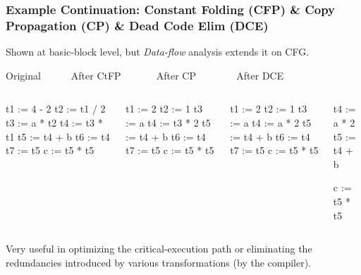 \documentclass{beamer}
\newcommand{\emp}[1]{\textcolor{DikuRed}{ #1}}
\begin{document}
\begin{frame}[fragile,t]
    \frametitle{Example Continuation: Constant Folding (CFP) \&
                    Copy Propagation (CP) \& Dead Code Elim (DCE)}

Shown at basic-block level, but {\em Data-flow} analysis extends it on CFG.

\begin{block}{Original{\tt~~~~~~}After CtFP{\tt~~~~~~~}After CP{\tt~~~~~~~~}After DCE}
\begin{columns}
\begin{colorcode}[fontsize=\scriptsize]
\emp{t1 := 4  - 2}
\emp{t2 := t1 / 2}
t3 := a  * \emp{t2}
t4 := t3 * \emp{t1}
t5 := t4 + b
t6 := t4
t7 := t5
c  := t5 * t5
\end{colorcode} 
\begin{colorcode}[fontsize=\scriptsize]
t1 := 2
t2 := 1
\emp{t3 := a}
t4 := \emp{t3} * 2
t5 := t4 + b
t6 := t4
t7 := t5
c  := t5 * t5
\end{colorcode} 
\begin{colorcode}[fontsize=\scriptsize]
\emp{t1 := 2}
\emp{t2 := 1}
\emp{t3 := a}
t4 := a  * 2
t5 := t4 + b
\emp{t6 := t4}
\emp{t7 := t5}
c  := t5 * t5
\end{colorcode} 
\begin{colorcode}[fontsize=\scriptsize]



t4 := a  * 2
t5 := t4 + b


c  := t5 * t5
\end{colorcode} 
\end{columns}
\end{block}

\bigskip

Very useful in optimizing the critical-execution path or eliminating
the redundancies introduced by various transformations 
(by the compiler).

\end{frame}
\end{document}
